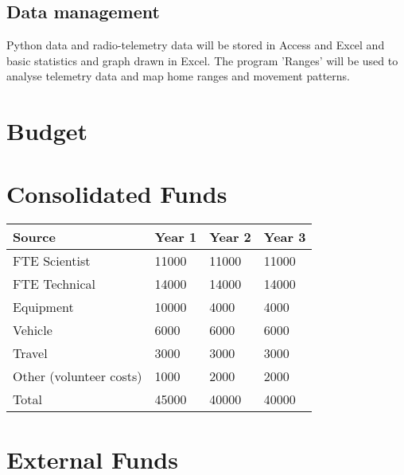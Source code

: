 \documentclass[version=last,
    paper=a4,                               %
    10pt,                                   %
    dvipsnames,
    oneside,                              %
    headings=openany,                       %
    open=any,
    BCOR=7mm,                               %
    DIV=15,     %
]{scrbook}
\begin{document}
\subsection*{Data management}

Python data and radio-telemetry data will be stored in Access and Excel
and basic statistics and graph drawn in Excel. The program 'Ranges' will
be used to analyse telemetry data and map home ranges and movement
patterns.




\section*{Budget}

\section*{Consolidated Funds }



\begin{longtabu} to \linewidth { |  X | X | X | X | }
\hline
{}
Source & Year 1 & Year 2 & Year 3\\
\hline
\endhead



FTE Scientist & 11000 & 11000 & 11000\\



FTE Technical & 14000 & 14000 & 14000\\



Equipment & 10000 & 4000 & 4000\\



Vehicle & 6000 & 6000 & 6000\\



Travel & 3000 & 3000 & 3000\\



Other (volunteer costs) & 1000 & 2000 & 2000\\



Total & 45000 & 40000 & 40000\\


\hline
\end{longtabu}



\section*{External Funds }
\end{document}
